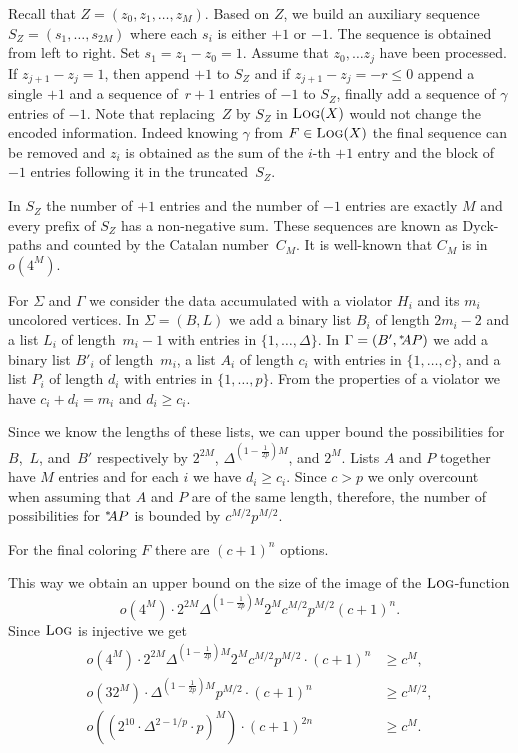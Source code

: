 \documentclass[11pt]{article}
\begin{document}
Recall that $Z=(z_0,z_1,\ldots,z_M)$.  Based on $Z$, we build an
auxiliary sequence $S_Z = (s_1,\ldots,s_{2M})$ where each $s_i$ is
either $+1$ or $-1$.  The sequence is obtained from left to right. Set
$s_1=z_1-z_0=1$.  Assume that $z_0,\ldots z_j$ have been processed. If
$z_{j+1}-z_j=1$, then append $+1$ to $S_Z$ and if
$z_{j+1}-z_j=-r \leq 0$ append a single $+1$ and a sequence of~$r+1$
entries of $-1$ to $S_Z$, finally add a sequence of $\gamma$ entries of
$-1$. Note that replacing~$Z$ by $S_Z$ in $\text{\scshape Log}(X)$ would not change
the encoded information. Indeed knowing $\gamma$ from $F\in\text{\scshape Log}(X)$ the
final sequence can be removed and $z_i$ is obtained as the sum of the
$i$-th $+1$ entry and the block of $-1$ entries following it in the
truncated~$S_Z$.

In $S_Z$ the number of $+1$ entries and the number of $-1$
entries are exactly $M$ and
every prefix of $S_Z$ has a non-negative sum.  These
sequences are known as Dyck-paths and counted
by the Catalan number~$C_M$. It is well-known that 
$C_M$ is in $o(4^{M})$.

For $\Sigma$ and $\Gamma$ we consider the data accumulated
with a violator $H_i$ and its $m_i$ uncolored vertices.
In $\Sigma=(B,L)$ we add a binary list $B_i$ of length $2m_i-2$
and a list $L_i$ of length~$m_i-1$ with entries in $\{1,\ldots,\Delta\}$.
In $\Gamma=(B',{}^{*}\kern-3pt AP)$ we add a binary list $B'_i$ of length~$m_i$,
a list $A_i$ of length $c_i$ with entries in $\{1,\ldots,c\}$,
and a list $P_i$ of length $d_i$ with entries in
$\{1,\ldots,p\}$. From the properties of a violator we have
$c_i+d_i=m_i$ and $d_i\geq c_i$.

Since we know the lengths of these lists, we can upper bound the
possibilities for~$B$,~$L$, and~$B'$ respectively by $2^{2M}$,
$\Delta^{\left(1-\frac{1}{2p}\right)M}$, and $2^M$. Lists $A$ and $P$
together have $M$ entries and for each $i$ we have $d_i\geq
c_i$. Since $c > p$ we only overcount when assuming that $A$ and $P$
are of the same length, therefore, the number of possibilities for
${}^{*}\kern-3pt AP$ is bounded by $c^{M/2}p^{M/2}$.

For the final coloring $F$ there are $(c+1)^n$ options.

This way we obtain an upper bound on the size of the image of the $\text{\scshape Log}$-function 
$$o(4^{M}) \cdot 2^{2M} \Delta^{\left(1-\frac{1}{2p}\right)M} 2^M c^{M/2}p^{M/2}(c+1)^n.$$
Since $\text{\scshape Log}$ is injective we get
\begin{align*}
o(4^{M}) \cdot 2^{2M} \Delta^{\left(1-\frac{1}{2p}\right)M} 2^M c^{M/2}p^{M/2}\cdot(c+1)^n &\geq c^M,\\
o(32^{M})\cdot \Delta^{\left(1-\frac{1}{2p}\right)M} p^{M/2}\cdot (c+1)^n &\geq c^{M/2},\\
o\left(\left(2^{10}\cdot\Delta^{2-1/p}\cdot p\right)^M\right)\cdot (c+1)^{2n} &\geq c^M.
\end{align*}
\end{document}
